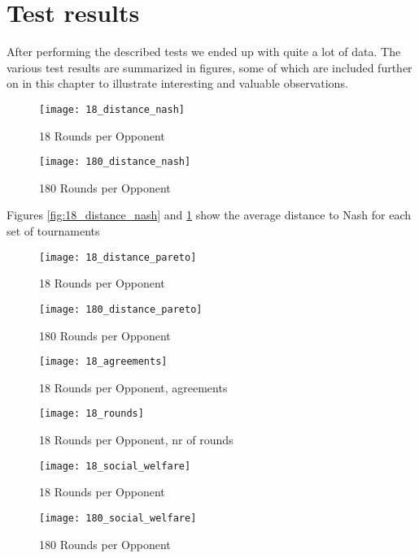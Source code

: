\section{Test results}
 
After performing the described tests we ended up with quite a lot of data. The various test results are summarized in figures, some of which are included further on in this chapter to illustrate interesting and valuable observations.



\begin{figure}[!htb]
	\texttt{[image: 18\_distance\_nash]}
	\caption{18 Rounds per Opponent}
	\label{fig:18_distance_nash}
	\endminipage\hfill
	\texttt{[image: 180\_distance\_nash]}
	\caption{180 Rounds per Opponent}
	\label{fig:180_distance_nash}
	\endminipage\hfill
\end{figure}

Figures \ref{fig:18_distance_nash} and \ref{fig:180_distance_nash} show the average distance to Nash for each set of tournaments



\begin{figure}[!htb]
	\texttt{[image: 18\_distance\_pareto]}
	\caption{18 Rounds per Opponent}
	\label{fig:18_distance_pareto}
	\endminipage\hfill
	\texttt{[image: 180\_distance\_pareto]}
	\caption{180 Rounds per Opponent}
	\label{fig:180_distance_pareto}
	\endminipage\hfill
\end{figure}



\begin{figure}[!htb]
	\texttt{[image: 18\_agreements]}
	\caption{18 Rounds per Opponent, agreements}
	\label{fig:18_agreements}
	\endminipage\hfill
	\texttt{[image: 18\_rounds]}
	\caption{18 Rounds per Opponent, nr of rounds}
	\label{fig:180_rounds}
	\endminipage\hfill
\end{figure}


\begin{figure}[!htb]
	\texttt{[image: 18\_social\_welfare]}
	\caption{18 Rounds per Opponent}
	\label{fig:18_social_welfare}
	\endminipage\hfill
	\texttt{[image: 180\_social\_welfare]}
	\caption{180 Rounds per Opponent}
	\label{fig:180_social_welfare}
	\endminipage\hfill
\end{figure}


